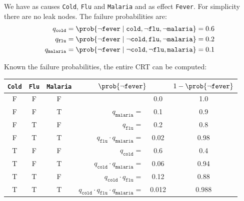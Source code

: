 \begin{example}
    We have as causes \texttt{Cold}, \texttt{Flu} and \texttt{Malaria} and as effect \texttt{Fever}.
    For simplicity there are no leak nodes.
    The failure probabilities are:
    \[
        \begin{split}
            q_\texttt{cold} &= \prob{\lnot \texttt{fever} \mid \texttt{cold}, \lnot\texttt{flu}, \lnot\texttt{malaria}} = 0.6 \\
            q_\texttt{flu} &= \prob{\lnot \texttt{fever} \mid \lnot\texttt{cold}, \texttt{flu}, \lnot\texttt{malaria}} = 0.2 \\
            q_\texttt{malaria} &= \prob{\lnot \texttt{fever} \mid \lnot\texttt{cold}, \lnot\texttt{flu}, \texttt{malaria}} = 0.1
        \end{split}    
    \]

    Known the failure probabilities, the entire CRT can be computed:
    \begin{center}
        \begin{tabular}{c|c|c|rc|c}
            \hline
            \texttt{Cold} & \texttt{Flu} & \texttt{Malaria} & \multicolumn{2}{c|}{$\prob{\lnot\texttt{fever}}$} & $1-\prob{\lnot\texttt{fever}}$ \\
            \hline
            F & F & F &                                                                 & 0.0       & 1.0 \\
            F & F & T & $q_\texttt{malaria} =$                                            & 0.1       & 0.9 \\
            F & T & F & $q_\texttt{flu} =$                                                & 0.2       & 0.8 \\
            F & T & T & $q_\texttt{flu} \cdot q_\texttt{malaria} =$                       & 0.02      & 0.98 \\
            T & F & F & $q_\texttt{cold} =$                                               & 0.6       & 0.4 \\
            T & F & T & $q_\texttt{cold} \cdot q_\texttt{malaria} =$                      & 0.06      & 0.94 \\
            T & T & F & $q_\texttt{cold} \cdot q_\texttt{flu} =$                          & 0.12      & 0.88 \\
            T & T & T & $q_\texttt{cold} \cdot q_\texttt{flu} \cdot q_\texttt{malaria} =$ & 0.012     & 0.988 \\
            \hline
        \end{tabular}
    \end{center}
\end{example}


